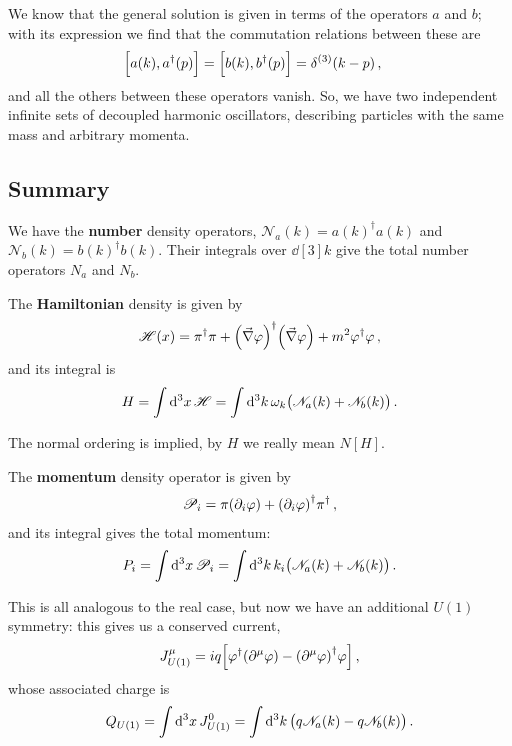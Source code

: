 \documentclass[main.tex]{subfiles}
\begin{document}
We know that the general solution  is given in terms of the operators \(a\) and \(b\); with its expression we find that the commutation relations between these are 
%
\begin{align}
\qty[a(k), a ^\dag(p)] = \qty[b(k), b ^\dag (p)] &= \delta^{(3)} (k-p)
\,,
\end{align}
%
and all the others between these operators vanish. 
So, we have two independent infinite sets of decoupled harmonic oscillators, describing particles with the same mass and arbitrary momenta. 

\subsection{Summary}

We have the \textbf{number} density operators, \(\mathscr{N}_{a} (k) = a(k) ^\dag a(k)\) and \(\mathscr{N}_{b} (k) = b(k) ^\dag b(k)\). 
Their integrals over \(\dd[3]{k}\) give the total number operators \(N_a\) and \(N_b\). 

The \textbf{Hamiltonian} density is given by 
%
\begin{align}
\mathscr{H}(x) = \pi ^\dag \pi 
+ \qty(\vec{\nabla} \varphi ) ^\dag \qty(\vec{\nabla} \varphi )
+ m^2 \varphi ^\dag \varphi  
\,,
\end{align}
%
and its integral is 
%
\begin{align}
H = \int \dd[3]{x} \mathscr{H} = 
\int \dd[3]{k} \omega_{k} \qty(\mathscr{N}_a (k) + \mathscr{N}_b (k))
\,.
\end{align}

The normal ordering is implied, by \(H\) we really mean \(N[H]\).

The \textbf{momentum} density operator is given by 
%
\begin{align}
\mathscr{P}_{i} = \pi \qty(\partial_{i} \varphi )
+ \qty(\partial_{i} \varphi ) ^\dag \pi ^\dag
\,,
\end{align}
%
and its integral gives the total momentum: 
%
\begin{align}
P_i = \int \dd[3]{x} \mathscr{P}_{i} = \int \dd[3]{k} k_i \qty(\mathscr{N}_a (k) + \mathscr{N}_b (k))
\,.
\end{align}

This is all analogous to the real case, but now we have an additional \(U(1)\) symmetry: this gives us a conserved current, 
%
\begin{align}
J^{\mu }_{U(1)} = i q \qty[ \varphi ^\dag \qty(\partial^{\mu } \varphi )
- \qty(\partial^{\mu } \varphi )^\dag \varphi ] 
\,,
\end{align}
%
whose associated charge is 
%
\begin{align}
Q_{U(1)} = \int \dd[3]{x} J^{0}_{U(1)}
= \int \dd[3]{k} \qty(q \mathscr{N}_a (k) - q \mathscr{N}_b(k))
\,.
\end{align}
\end{document}

